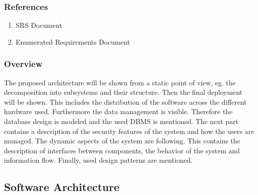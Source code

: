 		\subsubsection{References}
			\begin{enumerate}
				\item SRS Document
				\item Enumerated Requirements Document
			\end{enumerate}
		\subsubsection{Overview}
			The proposed architecture will be shown from a static point of view, eg. the decomposition into subsystems and their structure. Then the final deployment will be shown. This includes the distribution of the software across the different hardware used. Furthermore the data management is visible. Therefore the database design is modeled and the used DBMS is mentioned. The next part contains a description of the security features of the system and how the users are managed. The dynamic aspects of the system are following. This contains the description of interfaces between components, the behavior of the system and information flow. Finally, used design patterns are mentioned.

	\subsection{Software Architecture}
